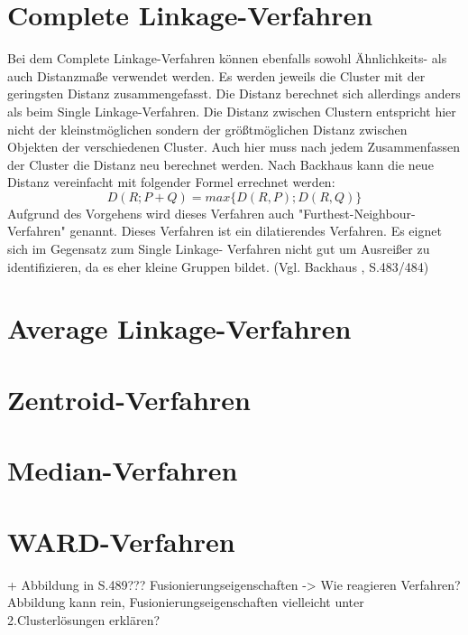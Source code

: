 \section{Complete Linkage-Verfahren}
Bei dem Complete Linkage-Verfahren können ebenfalls sowohl Ähnlichkeits- als auch Distanzmaße verwendet werden. Es werden jeweils die Cluster mit der geringsten Distanz zusammengefasst. Die Distanz berechnet sich allerdings anders als beim Single Linkage-Verfahren. Die Distanz zwischen Clustern entspricht hier nicht der kleinstmöglichen sondern der größtmöglichen Distanz zwischen Objekten der verschiedenen Cluster. Auch hier muss nach jedem Zusammenfassen der Cluster die Distanz neu berechnet werden.
Nach Backhaus \cite{Backhaus.2016} kann die neue Distanz vereinfacht mit folgender Formel errechnet werden:
\begin{equation}
D(R;P+Q) = max\{D(R,P);D(R,Q)\}
\end{equation}
Aufgrund des Vorgehens wird dieses Verfahren auch "Furthest-Neighbour-Verfahren" genannt.
Dieses Verfahren ist ein dilatierendes Verfahren. Es eignet sich im Gegensatz zum Single Linkage- Verfahren nicht gut um Ausreißer zu identifizieren, da es eher kleine Gruppen bildet. (Vgl. Backhaus \cite{Backhaus.2016}, S.483/484)

\section{Average Linkage-Verfahren}
\section{Zentroid-Verfahren}
\section{Median-Verfahren}
\section{WARD-Verfahren}

+ Abbildung in \cite{Backhaus.2016} S.489??? Fusionierungseigenschaften -> Wie reagieren Verfahren?
Abbildung kann rein, Fusionierungseigenschaften vielleicht unter 2.Clusterlösungen erklären?

